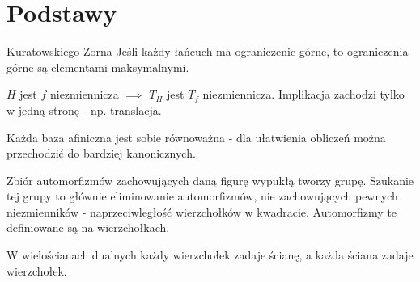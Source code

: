 \section{Podstawy}

\begin{lemma}{Kuratowskiego-Zorna}
    Jeśli każdy łańcuch ma ograniczenie górne, to ograniczenia górne są elementami maksymalnymi.
\end{lemma}

\begin{statement}
    $H$ jest $f$ niezmiennicza $\implies$ $T_H$ jest $T_f$ niezmiennicza. Implikacja zachodzi tylko w jedną stronę - np. translacja.
\end{statement}

\begin{statement}[sztuczka]
    Każda baza afiniczna jest sobie równoważna - dla ułatwienia obliczeń można przechodzić do bardziej kanonicznych.
\end{statement}

\begin{statement}
    Zbiór automorfizmów zachowujących daną figurę wypukłą tworzy grupę. Szukanie tej grupy to głównie eliminowanie automorfizmów, nie zachowujących pewnych niezmienników - naprzeciwległość wierzchołków w kwadracie. Automorfizmy te definiowane są na wierzchołkach.
\end{statement}

\begin{statement}
    W wielościanach dualnych każdy wierzchołek zadaje ścianę, a każda ściana zadaje wierzchołek.
\end{statement}